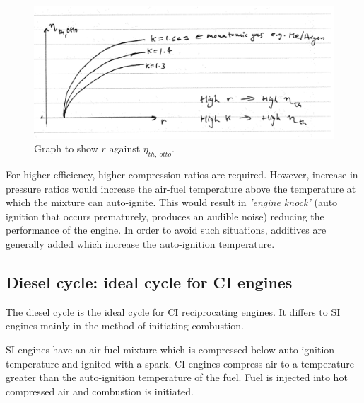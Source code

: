 \documentclass[class=report, crop=false, 12pt,a4paper]{standalone}
\begin{document}
\begin{figure}
  \centering
  \includegraphics[width = \textwidth]{../img/OttoThermoEfficiency}
  \caption{Graph to show $r$ against $\eta_{th , \ otto}$.}
\end{figure}
For higher efficiency, higher compression ratios are required. However, increase in pressure ratios would increase the air-fuel temperature above the temperature at which the mixture can auto-ignite. This would result in \emph{'engine knock'} (auto ignition that occurs prematurely, produces an audible noise) reducing the performance of the engine. In order to avoid such situations, additives are generally added which increase the auto-ignition temperature.
\subsection{Diesel cycle: ideal cycle for CI engines}
The diesel cycle is the ideal cycle for CI reciprocating engines. It differs to SI engines mainly in the method of initiating combustion.

SI engines have an air-fuel mixture which is compressed below auto-ignition temperature and ignited with a spark. CI engines compress air to a temperature greater than the auto-ignition temperature of the fuel. Fuel is injected into hot compressed air and combustion is initiated. 
\end{document}
